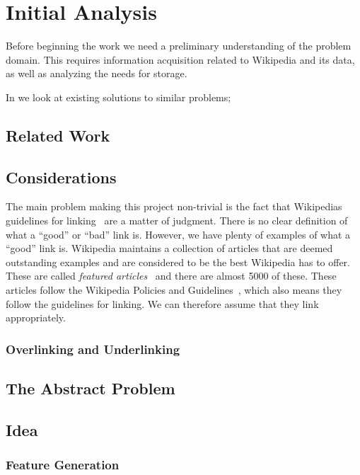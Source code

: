 \chapter{Initial Analysis}\label{chap:analysis}
Before beginning the work we need a preliminary understanding of the problem domain. This requires information acquisition related to Wikipedia and its data, as well as analyzing the needs for storage.

\begin{chapterorganization}
  \item In  we look at existing solutions to similar problems;
 
\end{chapterorganization}

\section{Related Work}\label{sec:related_work}
\dummy

\section{Considerations}
The main problem making this project non-trivial is the fact that Wikipedias guidelines for linking~\cite{wiki-manual-of-style-overlinking} are a matter of judgment. There is no clear definition of what a ``good'' or ``bad'' link is. However, we have plenty of examples of what a ``good'' link is.
Wikipedia maintains a collection of articles that are deemed outstanding examples and are considered to be the best Wikipedia has to offer. These are called \emph{featured articles}~\cite{wiki-featured-articles} and there are almost 5000 of these. These articles follow the Wikipedia Policies and Guidelines~\cite{wiki-editor-guidelines}, which also means they follow the guidelines for linking. We can therefore assume that they link appropriately.

\subsection{Overlinking and Underlinking}

\section{The Abstract Problem} 


\section{Idea} 

\subsection{Feature Generation}
\dummy

%
